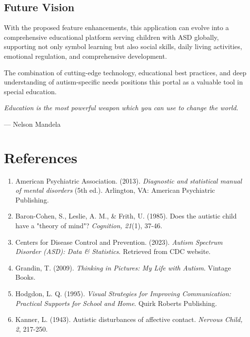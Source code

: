 \documentclass[12pt,a4paper]{article}
\begin{document}
\begin{itemize}
\subsection{Future Vision}
With the proposed feature enhancements, this application can evolve into a comprehensive educational platform serving children with ASD globally, supporting not only symbol learning but also social skills, daily living activities, emotional regulation, and comprehensive development.

The combination of cutting-edge technology, educational best practices, and deep understanding of autism-specific needs positions this portal as a valuable tool in special education.

\vspace{1cm}
\begin{center}
\textit{Education is the most powerful weapon which you can use to change the world.}

--- Nelson Mandela
\end{center}

\newpage
\section*{References}

\begin{enumerate}[leftmargin=*]
    \item American Psychiatric Association. (2013). \textit{Diagnostic and statistical manual of mental disorders} (5th ed.). Arlington, VA: American Psychiatric Publishing.
    
    \item Baron-Cohen, S., Leslie, A. M., \& Frith, U. (1985). Does the autistic child have a "theory of mind"? \textit{Cognition, 21}(1), 37-46.
    
    \item Centers for Disease Control and Prevention. (2023). \textit{Autism Spectrum Disorder (ASD): Data \& Statistics}. Retrieved from CDC website.
    
    \item Grandin, T. (2009). \textit{Thinking in Pictures: My Life with Autism}. Vintage Books.
    
    \item Hodgdon, L. Q. (1995). \textit{Visual Strategies for Improving Communication: Practical Supports for School and Home}. Quirk Roberts Publishing.
    
    \item Kanner, L. (1943). Autistic disturbances of affective contact. \textit{Nervous Child, 2}, 217-250.
    

\end{enumerate}
\end{itemize}
\end{document}
